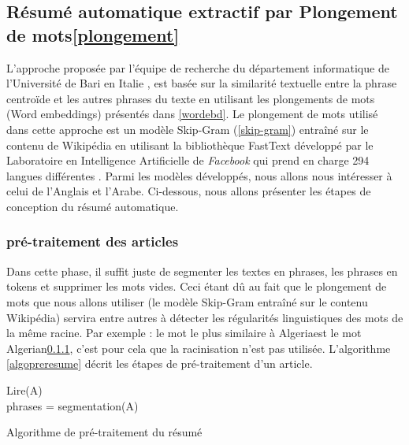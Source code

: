     \subsection{Résumé automatique extractif par Plongement de mots\ref{plongement}}
    L'approche proposée par l'équipe de recherche du département informatique de l'Université de Bari en Italie \cite{notrerésumé}, est basée sur la similarité textuelle entre la phrase centroïde et les autres phrases du texte en utilisant les plongements de mots (Word embeddings) présentés dans \autoref{wordebd}. Le plongement de mots utilisé dans cette approche est un modèle Skip-Gram (\autoref{skip-gram}) entraîné sur le contenu de Wikipédia en utilisant la bibliothèque FastText développé par le Laboratoire en Intelligence Artificielle de \emph{Facebook} qui prend en charge 294 langues différentes \cite{fasttext}. Parmi les modèles développés, nous allons nous intéresser à celui de l'Anglais et l'Arabe. Ci-dessous, nous allons présenter les étapes de conception du résumé automatique.

        \subsubsection{pré-traitement des articles}
        Dans cette phase, il suffit juste de segmenter les textes en phrases, les phrases en tokens et supprimer les mots vides. Ceci étant dû au fait que le plongement de mots que nous allons utiliser (le modèle Skip-Gram entraîné sur le contenu Wikipédia) servira entre autres à détecter les régularités linguistiques des  mots de la même racine. Par exemple : le mot le plus similaire à \textquotedbl Algeria\textquotedbl est le mot \textquotedbl Algerian\textquotedbl \ref{}, c'est pour cela que la racinisation n'est pas utilisée. L'algorithme \autoref{algopreresume} décrit les étapes de pré-traitement d'un article.

         \begin{algorithm2e}[H]
          \label{algopreresume}
          \SetAlgoLined
          Lire(A)\\
          phrases = segmentation(A)\\
         \caption{Algorithme de pré-traitement du résumé}
        \end{algorithm2e}


